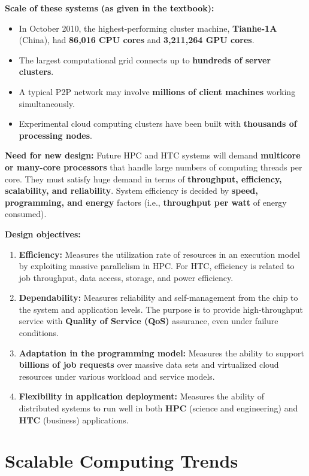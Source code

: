 \documentclass[11pt,a4paper]{article}
\begin{document}
\textbf{Scale of these systems (as given in the textbook):}
\begin{itemize}
\item In October 2010, the highest-performing cluster machine, \textbf{Tianhe-1A} (China), had \textbf{86,016 CPU cores} and \textbf{3,211,264 GPU cores}.
\item The largest computational grid connects up to \textbf{hundreds of server clusters}.
\item A typical P2P network may involve \textbf{millions of client machines} working simultaneously.
\item Experimental cloud computing clusters have been built with \textbf{thousands of processing nodes}.
\end{itemize}

\textbf{Need for new design:} Future HPC and HTC systems will demand \textbf{multicore or many-core processors} that handle large numbers of computing threads per core. They must satisfy huge demand in terms of \textbf{throughput, efficiency, scalability, and reliability}. System efficiency is decided by \textbf{speed, programming, and energy} factors (i.e., \textbf{throughput per watt} of energy consumed).

\textbf{Design objectives:}
\begin{enumerate}
\item \textbf{Efficiency:} Measures the utilization rate of resources in an execution model by exploiting massive parallelism in HPC. For HTC, efficiency is related to job throughput, data access, storage, and power efficiency.
\item \textbf{Dependability:} Measures reliability and self-management from the chip to the system and application levels. The purpose is to provide high-throughput service with \textbf{Quality of Service (QoS)} assurance, even under failure conditions.
\item \textbf{Adaptation in the programming model:} Measures the ability to support \textbf{billions of job requests} over massive data sets and virtualized cloud resources under various workload and service models.
\item \textbf{Flexibility in application deployment:} Measures the ability of distributed systems to run well in both \textbf{HPC} (science and engineering) and \textbf{HTC} (business) applications.
\end{enumerate}

\section{Scalable Computing Trends}
\end{document}
